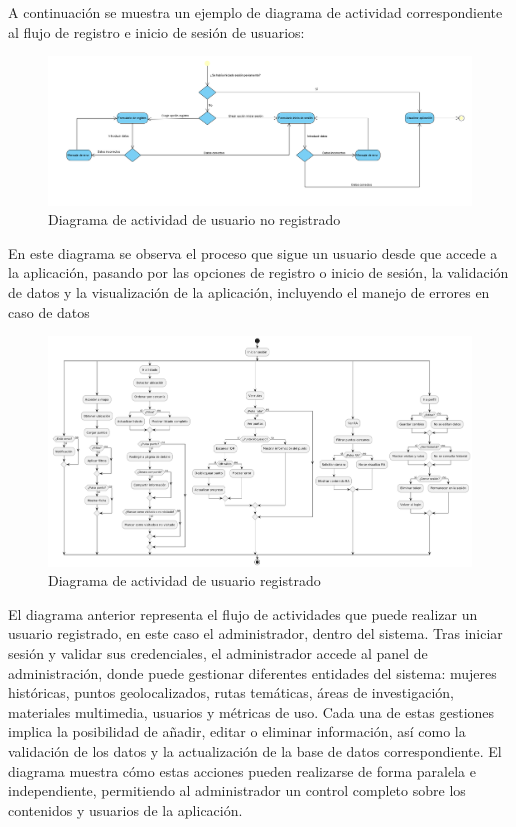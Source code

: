 A continuación se muestra un ejemplo de diagrama de actividad correspondiente al flujo de registro e inicio de sesión de usuarios:

\begin{figure}[H]
    \centering
    \includegraphics[width=1\textwidth]{figs/diagrama_actividad_usuario_no_registrado.png}
    \caption{Diagrama de actividad de usuario no registrado}
\end{figure}

En este diagrama se observa el proceso que sigue un usuario desde que accede a la aplicación, pasando por las opciones de registro o inicio de sesión, la validación de datos y la visualización de la aplicación, incluyendo el manejo de errores en caso de datos

\begin{figure}[H]
    \centering
    \includegraphics[width=1\textwidth]{figs/diagrama_actividad_usuario_registrado.png}
    \caption{Diagrama de actividad de usuario registrado}
\end{figure}

El diagrama anterior representa el flujo de actividades que puede realizar un usuario registrado, en este caso el administrador, dentro del sistema. Tras iniciar sesión y validar sus credenciales, el administrador accede al panel de administración, donde puede gestionar diferentes entidades del sistema: mujeres históricas, puntos geolocalizados, rutas temáticas, áreas de investigación, materiales multimedia, usuarios y métricas de uso. Cada una de estas gestiones implica la posibilidad de añadir, editar o eliminar información, así como la validación de los datos y la actualización de la base de datos correspondiente. El diagrama muestra cómo estas acciones pueden realizarse de forma paralela e independiente, permitiendo al administrador un control completo sobre los contenidos y usuarios de la aplicación.